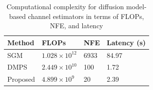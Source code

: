 \documentclass[lettersize,journal]{IEEEtran}
\begin{document}
\begin{table}[!t]
\centering
\renewcommand{\arraystretch}{1.1} 
\caption{Computational complexity for diffusion model-based channel estimators in terms of FLOPs, NFE, and latency}
\label{tab:table2}
\begin{tabular}{M{0.20\columnwidth}|M{0.21\columnwidth}|M{0.20\columnwidth}|M{0.20\columnwidth}}
\hline
\textbf{Method} & \textbf{FLOPs} & \textbf{NFE} & \textbf{Latency (s)} \\
\hline
SGM\cite{arvinteMIMOChannelEstimation2023} & \(1.028 \times 10^{12}\) & 6933 & 84.97 \\
\hline
DMPS\cite{zhouGenerativeDiffusionModels2025} & \(2.449 \times 10^{10}\) & 100 & 1.72 \\
\hline
Proposed & \(4.899 \times 10^9\) & 20 & 2.39 \\
\hline
\end{tabular}
\end{table}
\end{document}
